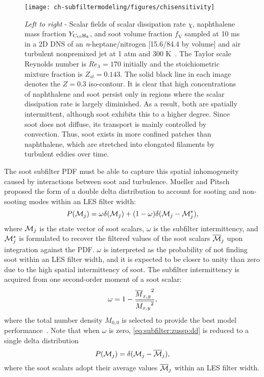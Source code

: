 \begin{figure}[htb]
  \begin{center}
    \texttt{[image: ch-subfiltermodeling/figures/chisensitivity]}
    \caption[Spatial Variability of  and Soot Fields]{\textit{Left to right} - Scalar fields of scalar dissipation rate $\chi$, naphthalene mass fraction $Y_{\ce{C10H8}}$, and soot volume fraction $f_{\text{V}}$ sampled at 10 ms in a 2D DNS of an \textit{n}-heptane/nitrogen [15.6/84.4 by volume] and air turbulent nonpremixed jet at 1 atm and 300 K~\cite{bisetti2012}. The Taylor scale Reynolds number is $Re_{\lambda} = 170$ initially and the stoichiometric mixture fraction is $Z_{st} = 0.143$. The solid black line in each image denotes the $Z = 0.3$ iso-contour. It is clear that high concentrations of naphthalene and soot persist only in regions where the scalar dissipation rate is largely diminished. As a result, both are spatially intermittent, although soot exhibits this to a higher degree. Since soot does not diffuse, its transport is mainly controlled by convection. Thus, soot exists in more confined patches than naphthalene, which are stretched into elongated filaments by turbulent eddies over time.}
    \label{fig:subfilter:zussp:chisensitivity}
  \end{center}
\end{figure}

The soot subfilter PDF must be able to capture this spatial inhomogeneity caused by interactions between soot and turbulence. Mueller and Pitsch~\cite{subfilterpdf2011} proposed the form of a double delta distribution to account for sooting and non-sooting modes within an LES filter width:
\begin{equation}\label{eq:subfilter:zussp:dd}
  P(\mathcal{M}_j) = \omega\delta(\mathcal{M}_j) + (1 - \omega)\delta(\mathcal{M}_j - \mathcal{M}_j^*),
\end{equation}
where $\mathcal{M}_j$ is the state vector of soot scalars, $\omega$ is the subfilter intermittency, and $\mathcal{M}_j^*$ is formulated to recover the filtered values of the soot scalars $\overline{\mathcal{M}}_j$ upon integration against the PDF. $\omega$ is interpreted as the probability of not finding soot within an LES filter width, and it is expected to be closer to unity than zero due to the high spatial intermittency of soot. The subfilter intermittency is acquired from one second-order moment of a soot scalar:
\begin{equation}\label{eq:subfilter:zussp:omega}
  \omega = 1 - \frac{{\overline{M}_{x,y}}^2}{\overline{{M_{x,y}}^2}},
\end{equation}
where the total number density $M_{0,0}$ is selected to provide the best model performance~\cite{subfilterpdf2011}. Note that when $\omega$ is zero, \cref{eq:subfilter:zussp:dd} is reduced to a single delta distribution
\begin{equation}\label{eq:subfilter:zussp:sd}
  P(\mathcal{M}_j) = \delta(\mathcal{M}_j - \overline{\mathcal{M}}_j),
\end{equation}
where the soot scalars adopt their average values $\overline{\mathcal{M}}_j$ within an LES filter width.

